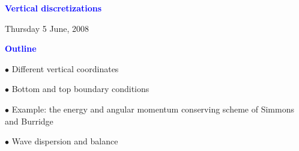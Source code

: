 \documentclass[a4]{seminar}
\newcommand{\B}[1]{\textcolor{blue}{#1}}
\begin{document}

\pagestyle{fancy}



\begin{slide}

\begin{center}

{\Large \bf
\B{Vertical discretizations}
}

\end{center}

\vspace{6mm}

\begin{center}
{\small Thursday 5 June, 2008}
\end{center}

\end{slide}


\begin{slide}

\B{\bf Outline}

\vspace{4mm}

\(\bullet\) Different vertical coordinates

\vspace{4mm}

\(\bullet\) Bottom and top boundary conditions

\vspace{4mm}

\(\bullet\) Example: the energy and angular momentum conserving scheme
of Simmons and Burridge

\vspace{4mm}

\(\bullet\) Wave dispersion and balance



\end{slide}

\end{document}
